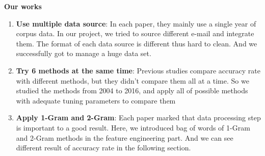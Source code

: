 \textbf{Our works}\\

\begin{enumerate}
	\item \textbf{Use multiple data source}: In each paper, they mainly use a single year of corpus data. In our project, we tried to source different e-mail and integrate them. The format of each data source is different thus hard to clean. And we successfully got to manage a huge data set. 
	\item \textbf{Try 6 methods at the same time}: Previous studies compare accuracy rate with different methods, but they didn't compare them all at a time. So we studied the methods from 2004 to 2016, and apply all of possible methods with adequate tuning parameters to compare them 
	\item \textbf{Apply 1-Gram and 2-Gram}: Each paper marked that data processing step is important to a good result. Here, we introduced bag of words of 1-Gram and 2-Gram methods in the feature engineering part. And we can see different result of accuracy rate in the following section.
\end{enumerate}

